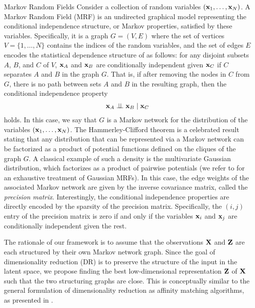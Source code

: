 \begin{mem1}{Markov Random Fields}\label{memo:MRFs}
    Consider a collection of random variables $({\mathbf{x}}_1, \dots, {\mathbf{x}}_N)$. A Markov Random Field (MRF) is an undirected graphical model representing the conditional independence structure, or Markov properties, satisfied by these variables. Specifically, it is a graph $G = (V, E)$ where the set of vertices $V = \{1, \dots, N\}$ contains the indices of the random variables, and the set of edges $E$ encodes the statistical dependence structure of as follows: for any disjoint subsets $A$, $B$, and $C$ of $V$, ${\mathbf{x}}_A$ and ${\mathbf{x}}_B$ are conditionally independent given ${\mathbf{x}}_C$ if $C$ separates $A$ and $B$ in the graph $G$. That is, if after removing the nodes in $C$ from $G$, there is no path between sets $A$ and $B$ in the resulting graph, then the conditional independence property 
    \begin{align}
        {\mathbf{x}}_A \perp\!\!\!\perp {\mathbf{x}}_B \mid {\mathbf{x}}_C 
    \end{align}
    holds. In this case, we say that $G$ is a Markov network for the distribution of the variables $({\mathbf{x}}_1, \dots, {\mathbf{x}}_N)$. The Hammerley-Clifford theorem \citep{clifford1990markov} is a celebrated result stating that any distribution that can be represented via a Markov network can be factorized as a product of potential functions defined on the cliques of the graph $G$. A classical example of such a density is the multivariate Gaussian distribution, which factorizes as a product of pairwise potentials (we refer to \citep{rue2005gaussian} for an exhaustive treatment of Gaussian MRFs). In this case, the edge weights of the associated Markov network are given by the inverse covariance matrix, called the \emph{precision matrix}. Interestingly, the conditional independence properties are directly encoded by the sparsity of the precision matrix. Specifically, the $(i, j)$ entry of the precision matrix is zero if and only if the variables ${\mathbf{x}}_i$ and ${\mathbf{x}}_j$ are conditionally independent given the rest.
\end{mem1}

The rationale of our framework is to assume that the observations $\mathbf{X}$ and $\mathbf{Z}$ are each structured by their own Markov network graph. Since the goal of dimensionality reduction (DR) is to preserve the structure of the input in the latent space, we propose finding the best low-dimensional representation $\mathbf{Z}$ of $\mathbf{X}$ such that the two structuring graphs are close. This is conceptually similar to the general formulation of dimensionality reduction as affinity matching algorithms, as presented in .

